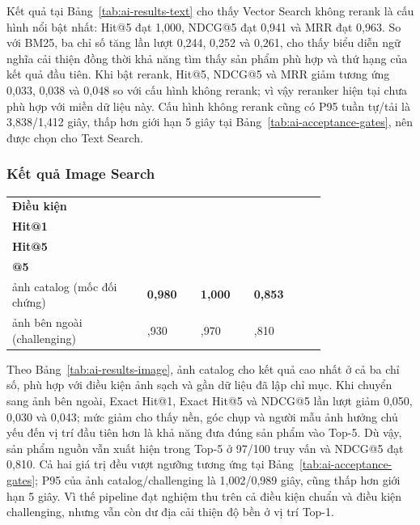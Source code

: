 Kết quả tại Bảng~\ref{tab:ai-results-text} cho thấy Vector Search không rerank là cấu hình nổi bật nhất: Hit@5 đạt 1,000, NDCG@5 đạt 0,941 và MRR đạt 0,963. So với BM25, ba chỉ số tăng lần lượt 0,244, 0,252 và 0,261, cho thấy biểu diễn ngữ nghĩa cải thiện đồng thời khả năng tìm thấy sản phẩm phù hợp và thứ hạng của kết quả đầu tiên. Khi bật rerank, Hit@5, NDCG@5 và MRR giảm tương ứng 0,033, 0,038 và 0,048 so với cấu hình không rerank; vì vậy reranker hiện tại chưa phù hợp với miền dữ liệu này. Cấu hình không rerank cũng có P95 tuần tự/tải là 3,838/1,412 giây, thấp hơn giới hạn 5 giây tại Bảng~\ref{tab:ai-acceptance-gates}, nên được chọn cho Text Search.

\subsubsection{Kết quả Image Search}

\begin{breakabletable}
\centering
\caption{Kết quả Image Search theo điều kiện ảnh}
\label{tab:ai-results-image}
\small
\begin{tabularx}{\linewidth}{|>{\RaggedRight\arraybackslash}p{0.43\linewidth}|>{\centering\arraybackslash}p{0.17\linewidth}|>{\centering\arraybackslash}p{0.17\linewidth}|>{\centering\arraybackslash}X|}
\hline
\textbf{Điều kiện} & \makecell{\textbf{Exact}\\\textbf{Hit@1}} & \makecell{\textbf{Exact}\\\textbf{Hit@5}} & \makecell{\textbf{NDCG}\\\textbf{@5}} \\ \hline
100 ảnh catalog (mốc đối chứng) & \textbf{0,980} & \textbf{1,000} & \textbf{0,853} \\ \hline
100 ảnh bên ngoài (challenging) & 0,930 & 0,970 & 0,810 \\ \hline
\end{tabularx}
\end{breakabletable}

Theo Bảng~\ref{tab:ai-results-image}, ảnh catalog cho kết quả cao nhất ở cả ba chỉ số, phù hợp với điều kiện ảnh sạch và gần dữ liệu đã lập chỉ mục. Khi chuyển sang ảnh bên ngoài, Exact Hit@1, Exact Hit@5 và NDCG@5 lần lượt giảm 0,050, 0,030 và 0,043; mức giảm cho thấy nền, góc chụp và người mẫu ảnh hưởng chủ yếu đến vị trí đầu tiên hơn là khả năng đưa đúng sản phẩm vào Top-5. Dù vậy, sản phẩm nguồn vẫn xuất hiện trong Top-5 ở 97/100 truy vấn và NDCG@5 đạt 0,810. Cả hai giá trị đều vượt ngưỡng tương ứng tại Bảng~\ref{tab:ai-acceptance-gates}; P95 của ảnh catalog/challenging là 1,002/0,989 giây, cũng thấp hơn giới hạn 5 giây. Vì thế pipeline đạt nghiệm thu trên cả điều kiện chuẩn và điều kiện challenging, nhưng vẫn còn dư địa cải thiện độ bền ở vị trí Top-1.

